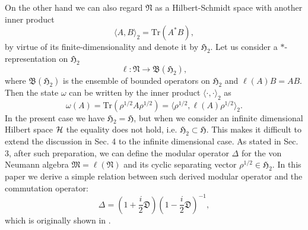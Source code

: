 On the other hand we can also regard $\mathfrak{N}$ as a Hilbert-Schmidt space with another inner product
$$
\langle A, B \rangle_2 =\mbox{Tr}(A^{\ast}B),
$$
by virtue of its finite-dimensionality and denote it by $\mathfrak{H}_2$.
Let us consider a $\ast$-representation on $\mathfrak{H}_2$
\begin{equation}\label{star-rep}
\ell :\mathfrak{N}\to \mathfrak{B}(\mathfrak{H}_2),
\end{equation}
where $\mathfrak{B}(\mathfrak{H}_2)$ is the ensemble of bounded operators on $\mathfrak{H}_2$
and $\ell(A)B=AB$.
Then the state $\omega$ can be written by the inner product $\langle \cdot, \cdot\rangle_2$ as 
$$
\omega(A)=\mbox{Tr}(\rho^{1/2}A\rho^{1/2})=\langle \rho^{1/2},\ell(A)\rho^{1/2}\rangle_2 .
$$
In the present case we have $\mathfrak{H}_2=\mathfrak{H}$, but when we consider an infinite
dimensional Hilbert space ${\cal H}$ the equality does not hold, i.e. $\mathfrak{H}_2\subset \mathfrak{H}$. This makes it difficult to extend the discussion in Sec. 4 to the infinite dimensional case.
As stated in Sec. 3, after such preparation, we can define the
modular operator $\Delta$ for the von Neumann algebra $\mathfrak{M}=\ell(\mathfrak{N})$ and its cyclic separating vector $\rho^{1/2} \in \mathfrak{H}_2$. 
In this paper we derive a simple relation between such derived modular operator and the commutation operator:
$$
    \Delta=\left(1+\frac{i}{2}\mathfrak{D}\right)\left(1-\frac{i}{2}\mathfrak{D}\right)^{-1},
$$
which is originally shown in \cite{Holevo_1977}.
